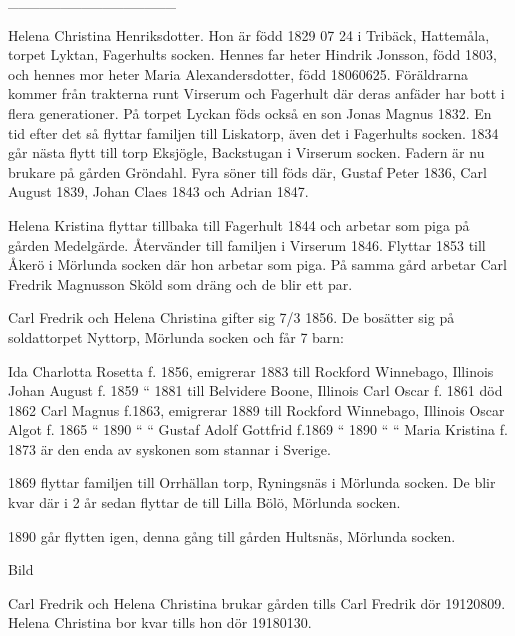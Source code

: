  


________________


Helena Christina Henriksdotter. Hon är född 1829 07 24 i Tribäck, Hattemåla, torpet  Lyktan, Fagerhults socken. Hennes far heter Hindrik Jonsson, född 1803, och hennes mor heter Maria Alexandersdotter, född 18060625. Föräldrarna kommer från trakterna runt Virserum och Fagerhult där deras anfäder har bott i flera generationer.
På torpet Lyckan föds också en son Jonas Magnus 1832. En tid efter det så flyttar familjen till Liskatorp, även det i Fagerhults socken.
1834 går nästa flytt till torp Eksjögle, Backstugan i Virserum socken. Fadern är nu brukare på gården Gröndahl. Fyra söner till föds där, Gustaf Peter 1836, Carl August 1839, Johan Claes 1843 och Adrian 1847.


Helena Kristina flyttar tillbaka till Fagerhult 1844 och arbetar som piga på gården Medelgärde. Återvänder till familjen i Virserum 1846. Flyttar 1853 till Åkerö i Mörlunda socken där hon arbetar som piga. På samma gård arbetar Carl Fredrik Magnusson Sköld som dräng och de blir ett par.





Carl Fredrik och Helena Christina gifter sig 7/3 1856. De bosätter sig på soldattorpet Nyttorp, Mörlunda socken och får 7 barn:


Ida Charlotta Rosetta f. 1856, emigrerar 1883 till Rockford Winnebago, Illinois
Johan August             f. 1859          “       1881 till Belvidere Boone, Illinois
Carl Oscar                  f. 1861 död 1862
Carl Magnus               f.1863,  emigrerar 1889 till Rockford Winnebago, Illinois
Oscar Algot                f. 1865          “        1890               “                           “                
Gustaf Adolf Gottfrid  f.1869           “        1890               “                           “
Maria Kristina f. 1873 är den enda av syskonen som stannar i Sverige.


1869 flyttar familjen till Orrhällan torp, Ryningsnäs i Mörlunda socken. De blir kvar där i 2 år sedan flyttar de till Lilla Bölö, Mörlunda socken.


1890 går flytten igen, denna gång till gården Hultsnäs, Mörlunda socken.


Bild


Carl Fredrik och Helena Christina brukar gården tills Carl Fredrik dör 19120809. Helena Christina bor kvar tills hon dör 19180130.




